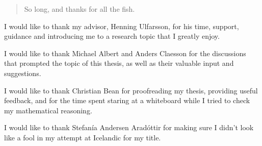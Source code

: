 \begin{quotation}
So long, and thanks for all the fish.
\end{quotation}
\vspace{\baselineskip}

I would like to thank my advisor, Henning Ulfarsson, for his time, support,
guidance and introducing me to a research topic that I greatly enjoy.

I would like to thank Michael Albert and Anders Claesson for the discussions that
prompted the topic of this thesis, as well as their valuable input and suggestions.

I would like to thank Christian Bean for proofreading my thesis, providing useful
feedback, and for the time spent staring at a whiteboard while I tried to check
my mathematical reasoning.

I would like to thank Stefanía Andersen Aradóttir for making sure I didn't look
like a fool in my attempt at Icelandic for my title.
